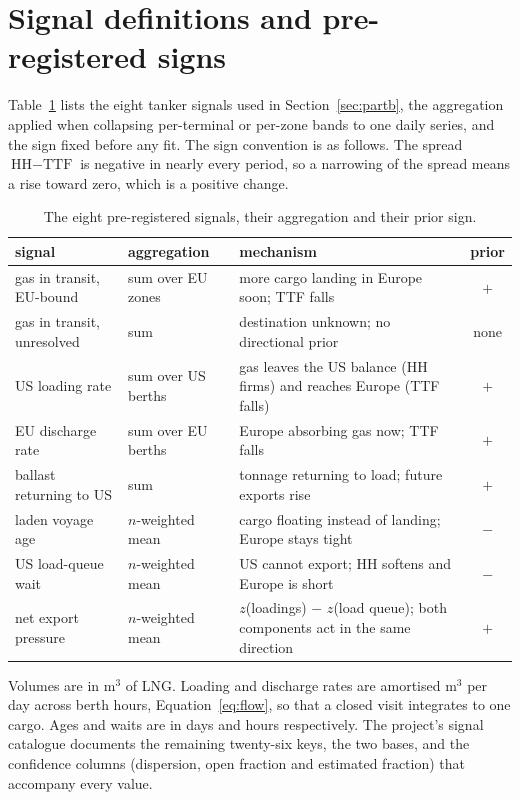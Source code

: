 \section{Signal definitions and pre-registered signs}\label{app:signals}

Table~\ref{tab:signals} lists the eight tanker signals used in
Section~\ref{sec:partb}, the aggregation applied when collapsing per-terminal or
per-zone bands to one daily series, and the sign fixed before any fit. The sign
convention is as follows. The spread $\text{HH}-\text{TTF}$ is negative in nearly
every period, so a narrowing of the spread means a rise toward zero, which is a
positive change.

\begin{table}[tb]
\centering\small
\caption{The eight pre-registered signals, their aggregation and their prior sign.}
\label{tab:signals}
\begin{tabular}{>{\raggedright\arraybackslash}p{3.6cm}>{\raggedright\arraybackslash}p{2.4cm}>{\raggedright\arraybackslash}p{8.6cm}c}
\toprule
signal & aggregation & mechanism & prior \\
\midrule
gas in transit, EU-bound & sum over EU zones & more cargo landing in Europe soon; TTF falls & $+$ \\
gas in transit, unresolved & sum & destination unknown; no directional prior & none \\
US loading rate & sum over US berths & gas leaves the US balance (HH firms) and reaches Europe (TTF falls) & $+$ \\
EU discharge rate & sum over EU berths & Europe absorbing gas now; TTF falls & $+$ \\
ballast returning to US & sum & tonnage returning to load; future exports rise & $+$ \\
laden voyage age & $n$-weighted mean & cargo floating instead of landing; Europe stays tight & $-$ \\
US load-queue wait & $n$-weighted mean & US cannot export; HH softens and Europe is short & $-$ \\
net export pressure & $n$-weighted mean & $z$(loadings) $-$ $z$(load queue); both components act in the same direction & $+$ \\
\bottomrule
\end{tabular}
\end{table}

Volumes are in m$^3$ of LNG. Loading and discharge rates are amortised m$^3$ per day
across berth hours, Equation~\eqref{eq:flow}, so that a closed visit integrates to
one cargo. Ages and waits are in days and hours respectively. The project's signal
catalogue documents the remaining twenty-six keys, the two bases, and the confidence
columns (dispersion, open fraction and estimated fraction) that accompany every
value.

